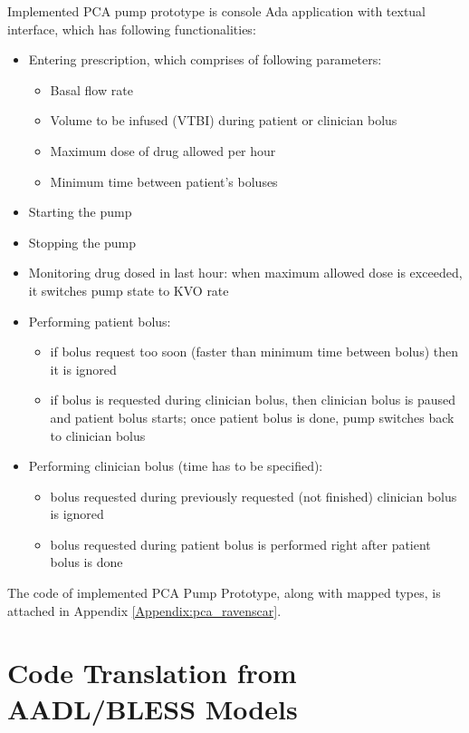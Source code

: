 Implemented PCA pump prototype is console Ada application with textual interface, which has following functionalities:
\begin{itemize}
	\item Entering prescription, which comprises of following parameters:
		\begin{itemize}
			\item Basal flow rate
			\item Volume to be infused (VTBI) during patient or clinician bolus
			\item Maximum dose of drug allowed per hour
			\item Minimum time between patient's boluses
		\end{itemize}
	\item Starting the pump
	\item Stopping the pump
	\item Monitoring drug dosed in last hour: when maximum allowed dose is exceeded, it switches pump state to KVO rate
	\item Performing patient bolus:
		\begin{itemize}
			\item if bolus request too soon (faster than minimum time between bolus) then it is ignored
			\item if bolus is requested during clinician bolus, then clinician bolus is paused and patient bolus starts; once patient bolus is done, pump switches back to clinician bolus
		\end{itemize}
	\item Performing clinician bolus (time has to be specified):
		\begin{itemize}
			\item bolus requested during previously requested (not finished) clinician bolus is ignored
			\item bolus requested during patient bolus is performed right after patient bolus is done
		\end{itemize}
\end{itemize}

The code of implemented PCA Pump Prototype, along with mapped types, is attached in Appendix \ref{Appendix:pca_ravenscar}.



\section{Code Translation from AADL/BLESS Models}
\label{pcapumpimpl:codegen}

